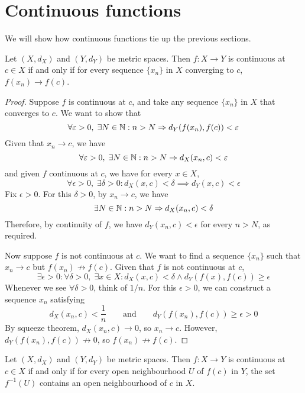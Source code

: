 \section{Continuous functions}
We will show how continuous functions tie up the previous sections.
\begin{prop}
  Let $(X, d_X)$ and $(Y, d_Y)$ be metric spaces. Then $f: X \to Y$ is continuous at $c \in X$ if and only if for every sequence $\{x_n\}$ in $X$ converging to $c$, $f(x_n) \to f(c)$.
\end{prop}
\begin{proof}
  Suppose $f$ is continuous at $c$, and take any sequence $\{x_n\}$ in $X$ that converges to $c$. We want to show that
  \[
    \forall \varepsilon > 0, \; \exists N \in \mathbb{N}: n > N \Rightarrow d_Y(f(x_n), f(c)) < \varepsilon
  \]
  Given that $x_n \to c$, we have
  \[
    \forall \varepsilon > 0, \; \exists N \in \mathbb{N}: n > N \Rightarrow d_X(x_n, c) < \varepsilon
  \]
  and given $f$ continuous at $c$, we have for every $x \in X$,
  \[
    \forall \epsilon > 0, \; \exists \delta > 0: d_X(x, c) < \delta \implies d_Y(x, c) < \epsilon
  \]
  Fix $\epsilon > 0$. For this $\delta > 0$, by $x_n \to c$, we have
  \[
    \exists N \in \mathbb{N}: n > N \Rightarrow d_X(x_n, c) < \delta
  \]
  Therefore, by continuity of $f$, we have $d_Y(x_n, c) < \epsilon$ for every $n > N$, as required.

  Now suppose $f$ is not continuous at $c$. We want to find a sequence $\{x_n\}$ such that $x_n \to c$ but $f(x_n) \not\to f(c)$. Given that $f$ is not continuous at $c$,
  \[
    \exists \epsilon > 0: \forall \delta > 0, \; \exists x \in X: d_X(x, c) < \delta \land d_Y(f(x), f(c)) \geq \epsilon
  \]
  Whenever we see $\forall \delta > 0$, think of $1 / n$. For this $\epsilon > 0$, we can construct a sequence $x_n$ satisfying
  \[
    d_X(x_n, c) < \frac{1}{n} \qquad \text{and} \qquad d_Y(f(x_n), f(c)) \geq \epsilon > 0
  \]
  By squeeze theorem, $d_X(x_n, c) \to 0$, so $x_n \to c$. However, $d_Y(f(x_n), f(c)) \not\to 0$, so $f(x_n) \not\to f(c)$.
\end{proof}
\begin{prop}
  Let $(X, d_X)$ and $(Y, d_Y)$ be metric spaces. Then $f: X \to Y$ is continuous at $c \in X$ if and only if for every open neighbourhood $U$ of $f(c)$ in $Y$, the set $f ^ {-1} (U)$ contains an open neighbourhood of $c$ in $X$.
\end{prop}
